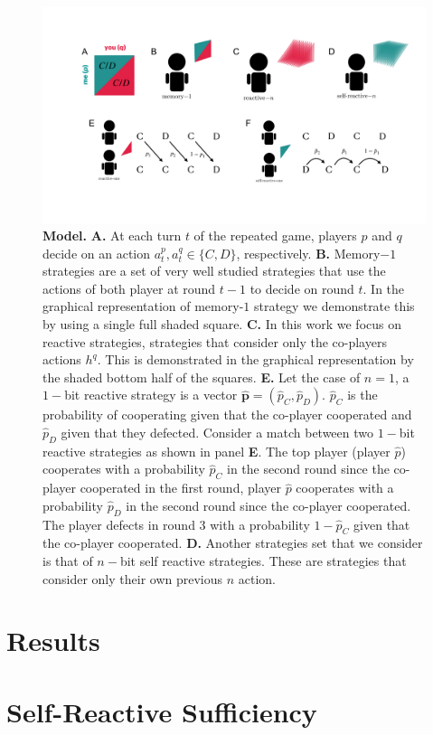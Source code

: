 \documentclass{article}
\theoremstyle{definition}
\begin{document}
\begin{figure}[h!]
  \centering
  \includegraphics[width=.75\textwidth]{figures/conceptual_figure_model.pdf}
  \caption{\textbf{Model.} \textbf{A.} At each turn $t$ of the repeated game,
  players \(p\) and \(q\) decide on an action \(a^{p}_{t}, a^{q}_{t} \in \{C,
  D\}\), respectively. \textbf{B.} Memory$-1$ strategies are a set of very well
  studied strategies that use the actions of both player at round $t-1$ to
  decide on round $t$. In the graphical representation of memory-$1$ strategy
  we demonstrate this by using a single full shaded square. \textbf{C.} In this work we
  focus on reactive strategies, strategies that consider only the
  co-players actions $h^q$. This is demonstrated in the graphical representation
  by the shaded bottom half of the squares. \textbf{E.} Let the case of $n=1$, a $1-$bit
  reactive strategy is a vector $\mathbf{\hat{p}}=(\hat{p}_{C}, \hat{p}_{D})$. $\hat{p}_C$
  is the probability of cooperating given that the co-player cooperated and $\hat{p}_D$
  given that they defected. Consider a 
  match between two $1-$bit reactive strategies as shown in panel \textbf{E}. The top
  player (player $\hat{p}$) cooperates with a probability $\hat{p}_C$ in the
  second round since the co-player cooperated in the first round, player
  $\hat{p}$ cooperates with a probability $\hat{p}_D$ in the second round
  since the co-player cooperated. The player defects in round 3 with a probability $1 -
  \hat{p}_C$ given that the co-player cooperated. \textbf{D.} Another strategies set that
  we consider is that of $n-$bit self reactive strategies. These are strategies that
  consider only their own previous $n$ action.}
\end{figure}

\section{Results}

\section{Self-Reactive Sufficiency}
\end{document}
